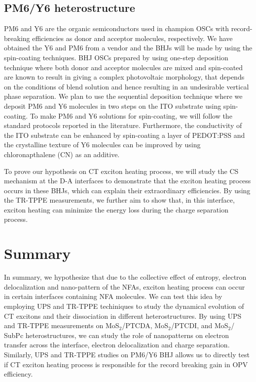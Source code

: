 \documentclass[12pt]{article}
\begin{document}
\subsection{PM6/Y6 heterostructure}
PM6 and Y6 are the organic semiconductors used in champion OSCs with record-breaking efficiencies as donor and acceptor molecules, respectively. We have obtained the Y6 and PM6 from a vendor and the BHJs will be made by using
the spin-coating techniques. BHJ OSCs prepared  by using one-step deposition technique where both donor and acceptor molecules are mixed and spin-coated are known to result in giving a complex photovoltaic  morphology, that depends on  the conditions of blend solution and hence resulting in an undesirable vertical phase separation. We plan to use the sequential deposition technique where we deposit PM6 and Y6 molecules in two steps on the ITO substrate using spin-coating. To make PM6 and Y6 solutions for spin-coating, we will follow the standard protocols reported in the literature. Furthermore, the conductivity of the ITO substrate can be enhanced by spin-coating a layer of PEDOT:PSS and the crystalline texture of Y6 molecules can be improved by using chloronapthalene (CN) as an additive.

To prove our hypothesis on CT exciton heating process, we will study the CS mechanism at the D-A interfaces to demonstrate that the exciton heating process occurs in these BHJs, which can explain their extraordinary efficiencies. By using the TR-TPPE measurements, we further aim to show that, in this interface, exciton heating can minimize the energy loss during the charge separation process.



\section{Summary}
In summary, we hypothesize that due to the collective effect of entropy, electron delocalization and nano-pattern of the NFAs, exciton heating process can occur in certain interfaces containing NFA molecules. We can test this idea by employing UPS and TR-TPPE techiniques to study the dynamical evolution of CT excitons and their dissociation in different heterostructures. By using UPS and TR-TPPE measurements on MoS$_2$/PTCDA, MoS$_2$/PTCDI, and MoS$_2$/ SubPc heterostructures, we can study the role of nanopatterns on electron transfer across the interface, electron delocalization and charge separation. Similarly, UPS and TR-TPPE studies on PM6/Y6 BHJ allows us to directly test if CT exciton heating process is responsible for the record breaking gain in OPV efficiency.



\end{document}

